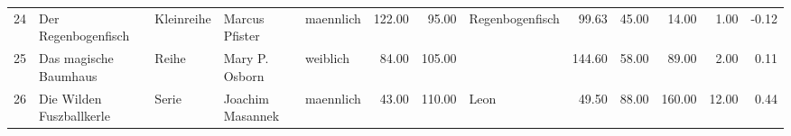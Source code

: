 \begin{sidewaystable}[ht]
\begin{center}
{\begin{tabular}{rllllrrlrrrrr}
  24 & Der Regenbogenfisch                                                                                                                                                                                                                                             & Kleinreihe & Marcus Pfister                                                                                                                                                                                                                                                  & maennlich & 122.00 & 95.00 & Regenbogenfisch                                                                                                                                                                                                                                                 & 99.63 & 45.00 & 14.00 & 1.00 & -0.12 \\ 
  25 & Das magische Baumhaus                                                                                                                                                                                                                                           & Reihe & Mary P. Osborn                                                                                                                                                                                                                                                  & weiblich & 84.00 & 105.00 &                                                                                                                                                                                                                                                                 & 144.60 & 58.00 & 89.00 & 2.00 & 0.11 \\ 
  26 & Die Wilden Fuszballkerle                                                                                                                                                                                                                                        & Serie & Joachim Masannek                                                                                                                                                                                                                                                & maennlich & 43.00 & 110.00 & Leon                                                                                                                                                                                                                                                            & 49.50 & 88.00 & 160.00 & 12.00 & 0.44 \\ 

\end{tabular}}
\end{center}
\end{sidewaystable}
